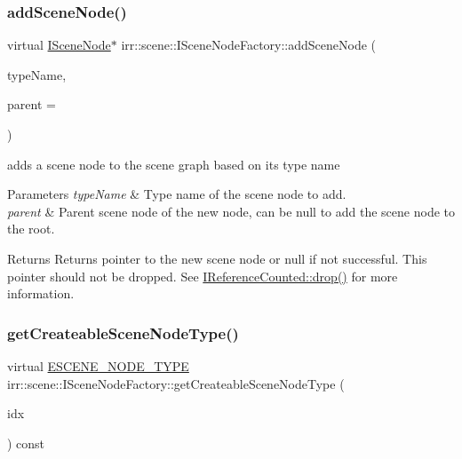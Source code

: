 \subsubsection{\texorpdfstring{add\+Scene\+Node()}{addSceneNode()}\hspace{0.1cm}{\footnotesize\ttfamily [2/2]}}
{\footnotesize\ttfamily virtual \hyperlink{classirr_1_1scene_1_1ISceneNode}{I\+Scene\+Node}$\ast$ irr\+::scene\+::\+I\+Scene\+Node\+Factory\+::add\+Scene\+Node (\begin{DoxyParamCaption}\item[{const \hyperlink{namespaceirr_a9395eaea339bcb546b319e9c96bf7410}{c8} $\ast$}]{type\+Name,  }\item[{\hyperlink{classirr_1_1scene_1_1ISceneNode}{I\+Scene\+Node} $\ast$}]{parent = {} }\end{DoxyParamCaption})\hspace{0.3cm}{\ttfamily [pure virtual]}}



adds a scene node to the scene graph based on its type name 


\begin{DoxyParams}{Parameters}
{\em type\+Name} & Type name of the scene node to add. \\
\hline
{\em parent} & Parent scene node of the new node, can be null to add the scene node to the root. \\
\hline
\end{DoxyParams}
\begin{DoxyReturn}{Returns}
Returns pointer to the new scene node or null if not successful. This pointer should not be dropped. See \hyperlink{classirr_1_1IReferenceCounted_a03856a09355b89d178090c4a5f738543}{I\+Reference\+Counted\+::drop()} for more information. 
\end{DoxyReturn}
\mbox{\label{classirr_1_1scene_1_1ISceneNodeFactory_aaff4e3d3dc214ec83965ecbd8e8175a3}} 
\subsubsection{\texorpdfstring{get\+Createable\+Scene\+Node\+Type()}{getCreateableSceneNodeType()}}
{\footnotesize\ttfamily virtual \hyperlink{namespaceirr_1_1scene_acad3d7ef92a9807d391ba29120f3b7bd}{E\+S\+C\+E\+N\+E\+\_\+\+N\+O\+D\+E\+\_\+\+T\+Y\+PE} irr\+::scene\+::\+I\+Scene\+Node\+Factory\+::get\+Createable\+Scene\+Node\+Type (\begin{DoxyParamCaption}\item[{\hyperlink{namespaceirr_a0416a53257075833e7002efd0a18e804}{u32}}]{idx }\end{DoxyParamCaption}) const\hspace{0.3cm}{\ttfamily [pure virtual]}}



